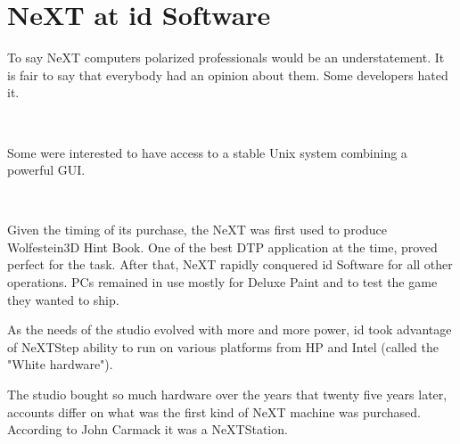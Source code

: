 \section{NeXT at id Software}
To say NeXT computers polarized professionals would be an understatement. It is fair to say that everybody had an opinion about them. Some developers hated it.\\
\par
{}\\
\par
Some were interested to have access to a stable Unix system combining a powerful GUI.\\
\par
{}\\
\par
Given the timing of its purchase, the NeXT was first used to produce Wolfestein3D Hint Book. One of the best DTP application at the time,  proved perfect for the task. After that, NeXT rapidly conquered id Software for all other operations. PCs remained in use mostly for Deluxe Paint and to test the game they wanted to ship.\\
\par
As the needs of the studio evolved with more and more power, id took advantage of NeXTStep ability to run on various platforms from HP and Intel (called the "White hardware").






The studio bought so much hardware over the years that twenty five years later, accounts differ on what was the first kind of NeXT machine was purchased. According to John Carmack it was a NeXTStation.\\
\par
\vspace{2mm}

